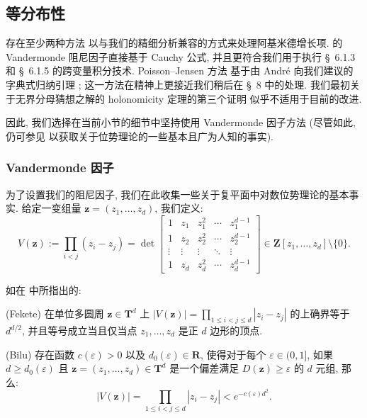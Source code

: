 \subsection{等分布性}\label{sec:6.5}

存在至少两种方法 \cite[§ 2.4 或 § 2.5]{CDT21} 以与我们的精细分析兼容的方式来处理阿基米德增长项.
\cite[§ 2.5]{CDT21} 的 Vandermonde 阻尼因子直接基于 Cauchy 公式, 并且更符合我们用于执行 \S~6.1.3 和 \S~6.1.5 的跨变量积分技术.
Poisson--Jensen 方法 \cite[§ 2.4]{CDT21} 基于由 Andr{\'e} 向我们建议的字典式归纳引理 \cite[Lemma 2.4.1]{CDT21}; 这一方法在精神上更接近我们稍后在 \S~8 中的处理.
我们最初关于无界分母猜想之解的 holonomicity 定理的第三个证明 \cite[§ 2.3]{CDT21} 似乎不适用于目前的改进.

因此, 我们选择在当前小节的细节中坚持使用 Vandermonde 因子方法 (尽管如此, 仍可参见 \cite[§ 2.5.1]{CDT21} 以获取关于位势理论的一些基本且广为人知的事实).

\subsubsection{Vandermonde 因子}\label{sec:6.5.1}

为了设置我们的阻尼因子, 我们在此收集一些关于复平面中对数位势理论的基本事实.
给定一变组量 $\mathbf{z} = (z_1, \dots, z_d)$, 我们定义:
\begin{equation}\label{eq:6.5.2}
V(\mathbf{z}) := \prod_{i < j} (z_i - z_j) = \det \begin{bmatrix} 1 & z_1 & z_1^2 & \cdots & z_1^{d-1} \\ 1 & z_2 & z_2^2 & \cdots & z_2^{d-1} \\ \vdots & \vdots & \vdots & \ddots & \vdots \\ 1 & z_d & z_d^2 & \cdots & z_d^{d-1} \end{bmatrix} \in \mathbf{Z}[z_1, \dots, z_d] \setminus \{0\}.
\end{equation}

如在 \cite[§ 2.5.1]{CDT21} 中所指出的:

\begin{lemma}\label{lem:6.5.3} (Fekete)
在单位多圆周 $\mathbf{z} \in \mathbf{T}^d$ 上 $|V(\mathbf{z})| = \prod_{1 \leq i < j \leq d} |z_i - z_j|$ 的上确界等于 $d^{d/2}$, 并且等号成立当且仅当点 $z_1, \ldots, z_d$ 是正 $d$ 边形的顶点.
\end{lemma}

\begin{lemma}\label{lem:6.5.4} (Bilu)
存在函数 $c(\varepsilon) > 0$ 以及 $d_0(\varepsilon) \in \mathbf{R}$, 使得对于每个 $\varepsilon \in (0,1]$, 如果 $d \geq d_0(\varepsilon)$ 且 $\mathbf{z} = (z_1, \ldots, z_d) \in \mathbf{T}^d$ 是一个偏差满足 $D(\mathbf{z}) \geq \varepsilon$ 的 $d$ 元组, 那么:
\begin{equation}\label{eq:6.5.5}
|V(\mathbf{z})| = \prod_{1 \le i < j \le d} |z_i - z_j| < e^{-c(\varepsilon)d^2}.
\end{equation}
\end{lemma}

